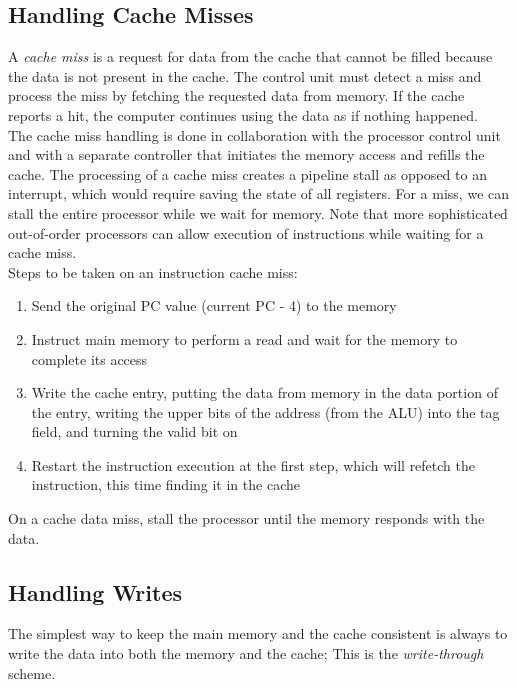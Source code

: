 \documentclass[12pt]{article}
\theoremstyle{definition}
\begin{document}
  \subsection{Handling Cache Misses}
  A \emph{cache miss} is a request for data from the cache that cannot be filled because the data is not present in the cache.
  The control unit must detect a miss and process the miss by fetching the requested data from memory.
  If the cache reports a hit, the computer continues using the data as if nothing happened. \\

  The cache miss handling is done in collaboration with the processor control unit and with a separate controller that initiates the memory access and refills the cache.
  The processing of a cache miss creates a pipeline stall as opposed to an interrupt, which would require saving the state of all registers.
  For a miss, we can stall the entire processor while we wait for memory.
  Note that more sophisticated out-of-order processors can allow execution of instructions while waiting for a cache miss. \\

  Steps to be taken on an instruction cache miss:
  \begin{enumerate}
    \item Send the original PC value (current PC - 4) to the memory
    \item Instruct main memory to perform a read and wait for the memory to complete its access
    \item Write the cache entry, putting the data from memory in the data portion of the entry, writing the upper bits of the address (from the ALU) into the tag field, and turning the valid bit on
    \item Restart the instruction execution at the first step, which will refetch the instruction, this time finding it in the cache
  \end{enumerate}

  On a cache data miss, stall the processor until the memory responds with the data.

  \subsection{Handling Writes}
  The simplest way to keep the main memory and the cache consistent is always to write the data into both the memory and the cache;
  This is the \emph{write-through} scheme. \\
\end{document}
